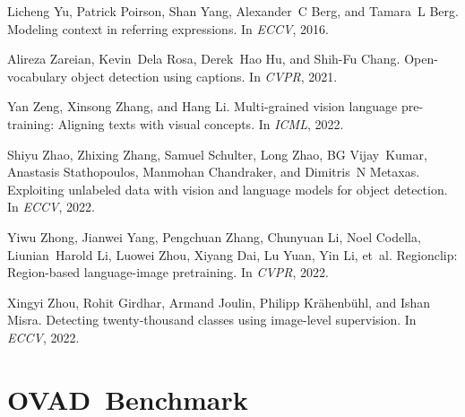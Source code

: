 \documentclass[10pt,twocolumn,letterpaper]{article}
\newcommand{\datasetname}{OVAD}
\begin{document}
\begin{thebibliography}{10}
Licheng Yu, Patrick Poirson, Shan Yang, Alexander~C Berg, and Tamara~L Berg.
\newblock Modeling context in referring expressions.
\newblock In {\em ECCV}, 2016.

Alireza Zareian, Kevin~Dela Rosa, Derek~Hao Hu, and Shih-Fu Chang.
\newblock Open-vocabulary object detection using captions.
\newblock In {\em CVPR}, 2021.

Yan Zeng, Xinsong Zhang, and Hang Li.
\newblock Multi-grained vision language pre-training: Aligning texts with
  visual concepts.
\newblock In {\em ICML}, 2022.

Shiyu Zhao, Zhixing Zhang, Samuel Schulter, Long Zhao, BG Vijay~Kumar,
  Anastasis Stathopoulos, Manmohan Chandraker, and Dimitris~N Metaxas.
\newblock Exploiting unlabeled data with vision and language models for object
  detection.
\newblock In {\em ECCV}, 2022.

Yiwu Zhong, Jianwei Yang, Pengchuan Zhang, Chunyuan Li, Noel Codella,
  Liunian~Harold Li, Luowei Zhou, Xiyang Dai, Lu Yuan, Yin Li, et~al.
\newblock Regionclip: Region-based language-image pretraining.
\newblock In {\em CVPR}, 2022.

Xingyi Zhou, Rohit Girdhar, Armand Joulin, Philipp Kr{\"a}henb{\"u}hl, and
  Ishan Misra.
\newblock Detecting twenty-thousand classes using image-level supervision.
\newblock In {\em ECCV}, 2022.

\end{thebibliography}
 
\clearpage  
\newpage

\appendix

\tableofcontents

\section{\datasetname\ Benchmark}
\end{document}
